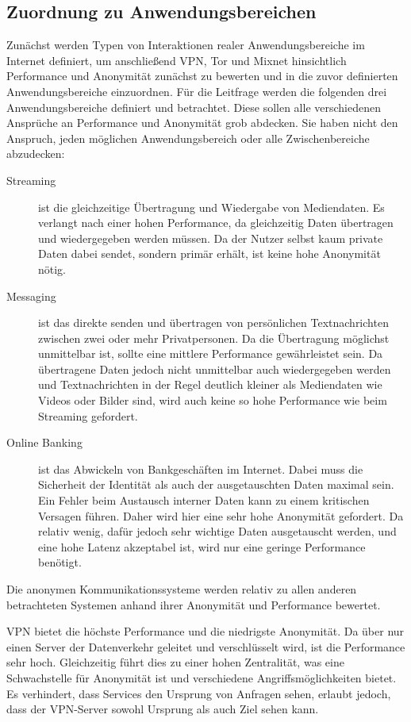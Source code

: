 \subsection{Zuordnung zu Anwendungsbereichen}

Zunächst werden Typen von Interaktionen realer Anwendungsbereiche im Internet definiert, um anschließend VPN, Tor und Mixnet hinsichtlich Performance und Anonymität zunächst zu bewerten und in die zuvor definierten Anwendungsbereiche einzuordnen.
Für die Leitfrage werden die folgenden drei Anwendungsbereiche definiert und betrachtet. Diese sollen alle verschiedenen Ansprüche an Performance und Anonymität grob abdecken. Sie haben nicht den Anspruch, jeden möglichen Anwendungsbereich oder alle Zwischenbereiche abzudecken:

\begin{description}
    \item[Streaming] ist die gleichzeitige Übertragung und Wiedergabe von Mediendaten. Es verlangt nach einer hohen Performance, da gleichzeitig Daten übertragen und wiedergegeben werden müssen. Da der Nutzer selbst kaum private Daten dabei sendet, sondern primär erhält, ist keine hohe Anonymität nötig.
    \item[Messaging] ist das direkte senden und übertragen von persönlichen Textnachrichten zwischen zwei oder mehr Privatpersonen. Da die Übertragung möglichst unmittelbar ist, sollte eine mittlere Performance gewährleistet sein. Da übertragene Daten jedoch nicht unmittelbar auch wiedergegeben werden und Textnachrichten in der Regel deutlich kleiner als Mediendaten wie Videos oder Bilder sind, wird auch keine so hohe Performance wie beim Streaming gefordert.
    \item[Online Banking] ist das Abwickeln von Bankgeschäften im Internet. Dabei muss die Sicherheit der Identität als auch der ausgetauschten Daten maximal sein. Ein Fehler beim Austausch interner Daten kann zu einem kritischen Versagen führen. Daher wird hier eine sehr hohe Anonymität gefordert. Da relativ wenig, dafür jedoch sehr wichtige Daten ausgetauscht werden, und eine hohe Latenz akzeptabel ist, wird nur eine geringe Performance benötigt.
\end{description}

Die anonymen Kommunikationssysteme werden relativ zu allen anderen betrachteten Systemen anhand ihrer Anonymität und Performance bewertet.

VPN bietet die höchste Performance und die niedrigste Anonymität. Da über nur einen Server der Datenverkehr geleitet und verschlüsselt wird, ist die Performance sehr hoch. Gleichzeitig führt dies zu einer hohen Zentralität, was eine Schwachstelle für Anonymität ist und verschiedene Angriffsmöglichkeiten bietet. Es verhindert, dass Services den Ursprung von Anfragen sehen, erlaubt jedoch, dass der VPN-Server sowohl Ursprung als auch Ziel sehen kann.

